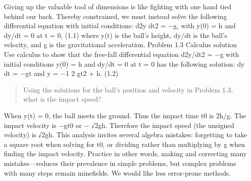 \documentclass[12pt,a4paper]{article}
\begin{document}
Giving up the valuable tool of dimensions is like fighting with one hand
tied behind our back. Thereby constrained, we must instead solve the
following differential equation with initial conditions:
d2y
dt2 = −g, with y(0) = h and dy/dt = 0 at t = 0, (1.1)
where y(t) is the ball’s height, dy/dt is the ball’s velocity, and g is the
gravitational acceleration.
Problem 1.3 Calculus solution
Use calculus to show that the free-fall differential equation d2y/dt2 = −g with
initial conditions y(0) = h and dy/dt = 0 at t = 0 has the following solution:
dy
dt = −gt and y = −1
2
gt2 + h. (1.2) \\
\begin{quote} Using the solutions for the ball’s position and velocity in Problem 1.3, what is
the impact speed? 
\end{quote}
When
y(t) = 0, the ball meets the ground. Thus the impact time t0 is
2h/g. The impact velocity is −gt0 or −
√2gh. Therefore the impact
speed (the unsigned velocity) is √2gh.
This analysis invites several algebra mistakes: forgetting to take a square
root when solving for t0, or dividing rather than multiplying by g when
finding the impact velocity. Practice in other words, making and correcting many mistakes—reduces their prevalence in simple problems, but
complex problems with many steps remain minefields. We would like
less error-prone methods.
\end{document}
